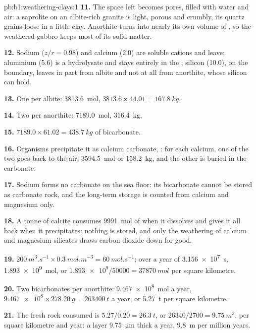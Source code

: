 \begin{solution}{pb:b1:weathering-clays:1}
\textbf{11.} The space left becomes pores, filled with water and air: a
saprolite on an albite-rich granite is light, porous and crumbly, its quartz
grains loose in a little clay. Anorthite turns into nearly its own volume of
, so the weathered gabbro keeps most of its solid matter.

\textbf{12.} Sodium ($z/r = 0.98$) and calcium (2.0) are soluble cations and
leave; aluminium (5.6) is a hydrolysate and stays entirely in the ;
silicon (10.0), on the boundary, leaves in part from albite and not at all
from anorthite, whose silicon  can hold.

\textbf{13.} One  per albite: \qty{3813.6}{mol}, $3813.6 \times 44.01 =
\qty{167.8}{kg}$.

\textbf{14.} Two per anorthite: \qty{7189.0}{mol}, \qty{316.4}{kg}.

\textbf{15.} $7189.0 \times 61.02 = \qty{438.7}{kg}$ of bicarbonate.

\textbf{16.} Organisms precipitate it as calcium carbonate,
: for each calcium, one of the two
 goes back to the air, \qty{3594.5}{mol} or \qty{158.2}{kg}, and the
other is buried in the carbonate.

\textbf{17.} Sodium forms no carbonate on the sea floor: its bicarbonate
cannot be stored as carbonate rock, and the long-term storage is counted from
calcium and magnesium only.

\textbf{18.} A tonne of calcite consumes \qty{9991}{mol} of  when it
dissolves and gives it all back when it precipitates: nothing is stored, and
only the weathering of calcium and magnesium silicates draws carbon dioxide
down for good.

\textbf{19.} $\qty{200}{m^3.s^{-1}} \times \qty{0.3}{mol.m^{-3}} =
\qty{60}{mol.s^{-1}}$; over a year of \qty{3.156e7}{s}, \qty{1.893e9}{mol}, or
$\num{1.893e9}/\num{50000} = \qty{37870}{mol}$ per square kilometre.

\textbf{20.} Two bicarbonates per anorthite: \qty{9.467e8}{mol} a year,
$\num{9.467e8}\times\qty{278.20}{g} = \qty{263400}{t}$ a year, or
\qty{5.27}{t} per square kilometre.

\textbf{21.} The fresh rock consumed is $5.27/0.20 = \qty{26.3}{t}$, or
$\num{26340}/2700 = \qty{9.75}{m^3}$, per square kilometre and year: a layer
\qty{9.75}{\micro m} thick a year, \qty{9.8}{m} per million years.


\end{solution}
